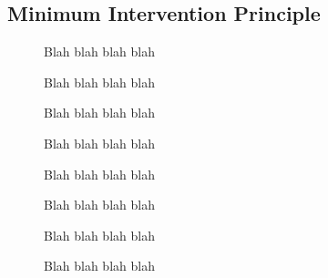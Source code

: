 \documentclass[../main.tex]{subfiles}
\begin{document}
\subsection{Minimum Intervention Principle}

\begin{figure}[H]
    \caption{Blah blah blah blah}\label{fig:behavior}
\end{figure}

\begin{figure}[H]
    \caption{Blah blah blah blah}\label{fig:behavior}
\end{figure}

\begin{figure}[H]
    \caption{Blah blah blah blah}\label{fig:behavior}
\end{figure}

\begin{figure}[H]
    \caption{Blah blah blah blah}\label{fig:behavior}
\end{figure}

\begin{figure}[H]
    \caption{Blah blah blah blah}\label{fig:behavior}
\end{figure}

\begin{figure}[H]
    \caption{Blah blah blah blah}\label{fig:behavior}
\end{figure}

\begin{figure}[H]
    \caption{Blah blah blah blah}\label{fig:behavior}
\end{figure}

\begin{figure}[H]
    \caption{Blah blah blah blah}\label{fig:behavior}
\end{figure}
\end{document}
